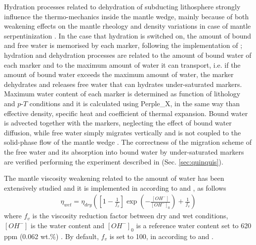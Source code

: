 Hydration processes related to dehydration of subducting lithosphere \citep{Schmidt1998,Liu2007,Faccenda2009,Faccenda2010,Faccenda2014,Rosas2016} strongly
influence the thermo-mechanics inside the mantle wedge, mainly because of both weakening effects on the mantle rheology and density variations in case of mantle serpentinization \citep{Gerya2002,Honda2003,Arcay2005,Roda2010,Regorda2017}. In the case that hydration is switched on, the amount of bound and free water is memorised by each marker, following the implementation of \citet{Quinquis2014}; hydration and dehydration processes are related to the amount of bound water of each marker and to the maximum amount of water it can transport, i.e. if the amount of bound water exceeds the maximum amount of water, the marker dehydrates and releases free water that can hydrates under-saturated markers. Maximum water content of each marker is determined as function of lithology and $p$-$T$ conditions and it is calculated using Perple\_X, in the same way than effective density, specific heat and coefficient of thermal expansion. Bound water is advected together with the markers, neglecting the effect of bound water diffusion, while free water simply migrates vertically and is not coupled to the solid-phase flow of the mantle wedge \citep{Arcay2005,Quinquis2014}. The correctness of the migration scheme of the free water and its absorption into bound
water by under-saturated markers are verified performing the experiment described in \citet{Quinquis2014} (Sec. \ref{sec:quinquis}).

The mantle viscosity weakening related to the amount of water has been extensively studied \citep{Chopra1981,Hirth2003} and it is implemented in according to \citet{Arcay2005} and \citet{Horiuchi2016}, as follows
\begin{eqnarray}\label{eq:wet_visc}
\eta_{wet}=\eta_{dry}\left(\left[1-\frac{1}{f_v}\right]\exp\left(-\frac{[OH^-]}{[OH^-]_0}\right)+\frac{1}{f_v}\right)
\end{eqnarray}
where $f_v$ is the viscosity reduction factor between dry and wet conditions, $[OH^-]$ is the water content and $[OH^-]_0$ is a reference water content set to 620 ppm (0.062 wt.\%) \citep{Arcay2005}. By default, $f_v$ is set to 100, in according to \citet{Arcay2005} and \citet{Horiuchi2016}.